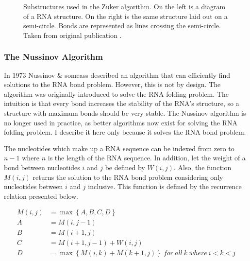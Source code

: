 \documentclass[12pt, a4paper]{article}
\begin{document}
\begin{figure}
\begin{center}
\end{center}
\caption{Substructures used in the Zuker algorithm. On the left is a diagram of a RNA structure. On the right is the same structure laid out on a semi-circle. Bonds are represented as lines crossing the semi-circle. Taken from original
publication \cite{zuker1981optimal}.}
\label{fig:zuk_struct}
\end{figure}

\subsubsection{The Nussinov Algorithm}
In 1973 Nussinov \& someass described an algorithm that can efficiently find solutions to the RNA bond problem. However, this is not by design. The algorithm was originally introduced to solve the RNA folding problem. The intuition is that every bond increases the stability of the RNA's structure, so a structure with maximum bonds should be very stable. The Nussinov algorithm is no longer used in practice, as better algorithms now exist for solving the RNA folding problem. I describe it here only because it solves the RNA bond problem.

The nucleotides which make up a RNA sequence can be indexed from zero to $n-1$ where $n$ is the length of the RNA sequence. In addition, let the weight of a bond between nucleotides $i$ and $j$ be defined by $W(i,j)$. Also, the function $M(i,j)$ returns the solution to the RNA bond problem considering only nucleotides between $i$ and $j$ inclusive. This function is defined by the recurrence relation presented below.

\begin{align} \label{eq:nuss_eq}
	M(i, j) &= \max \left\lbrace A, B, C, D \right\rbrace \nonumber  \\
	A &= M(i, j-1) \nonumber \\
	B &= M(i+1, j) \nonumber \\
	C &= M(i+1, j-1) + W(i, j) \nonumber \\
	D &= \max \left\lbrace M(i, k) + M(k+1, j) \right\rbrace \: for \: all \: k \: where \: i < k < j \nonumber	\\
\end{align}
\end{document}
